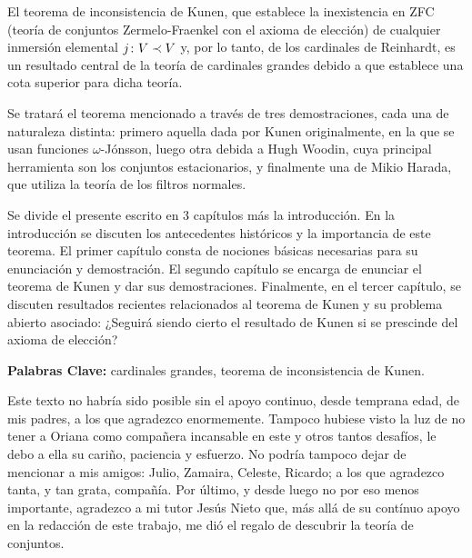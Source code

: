El teorema de inconsistencia de Kunen, que establece la inexistencia en
ZFC (teoría de conjuntos Zermelo-Fraenkel con el axioma de elección)
de cualquier inmersión elemental $j\colon V\prec V$ y, por lo tanto, de los cardinales
de Reinhardt, es un resultado central de la teoría de cardinales grandes
debido a que establece una cota superior para dicha teoría.

Se tratará el teorema mencionado a través de tres demostraciones, cada una de naturaleza
distinta: primero aquella dada por Kunen originalmente, en la que se usan funciones $\omega$-Jónsson,
luego otra debida a Hugh Woodin, cuya principal herramienta son los conjuntos estacionarios,
y finalmente una de Mikio Harada, que utiliza la teoría de los filtros normales.

Se divide el presente escrito en 3 capítulos más la introducción.
En la introducción se discuten los antecedentes históricos y la importancia
de este teorema.
El primer capítulo consta de nociones básicas necesarias para su enunciación y demostración.
El segundo capítulo se encarga de enunciar el teorema de Kunen y dar sus demostraciones.
Finalmente, en el tercer capítulo, se discuten resultados recientes relacionados al teorema de Kunen
y su problema abierto asociado:
¿Seguirá siendo cierto el resultado de Kunen si se prescinde del axioma de elección?

\vspace{\fill}

\textbf{Palabras Clave:} cardinales grandes, teorema de inconsistencia de Kunen.
\fi
\ifagradecimientos\newpage
{}

Este texto no habría sido posible sin el apoyo continuo,
desde temprana edad, de mis padres, a los que agradezco enormemente.
Tampoco hubiese visto la luz de no tener a Oriana como
compañera incansable en este y otros tantos desafíos, le debo a ella
su cariño, paciencia y esfuerzo.
No podría tampoco dejar de mencionar a mis amigos: Julio, Zamaira,
Celeste, Ricardo; a los que agradezco tanta, y tan grata, compañía.
Por último, y desde luego no por eso menos importante, agradezco a mi
tutor Jesús Nieto que, más allá de su contínuo apoyo en la redacción
de este trabajo, me dió el regalo de descubrir la teoría de conjuntos.
\fi
\iftoc \ToC \fi
\iflistas
{}

